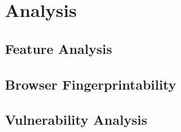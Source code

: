 \section{Analysis}
\label{sec:analysis}

\subsection{Feature Analysis}



\subsection{Browser Fingerprintability}



\subsection{Vulnerability Analysis}

